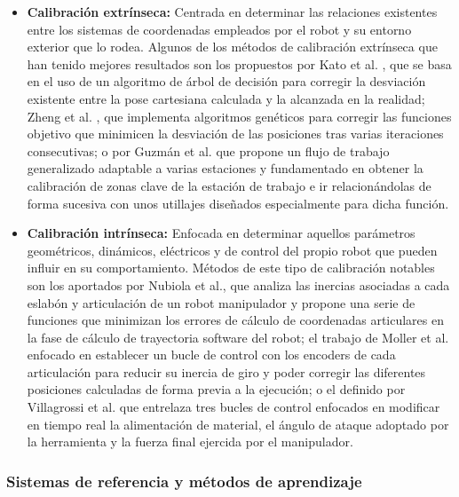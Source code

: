 \begin{itemize}
    \item \textbf{Calibración extrínseca:} Centrada en determinar las relaciones existentes entre los sistemas de coordenadas empleados por el robot y su entorno exterior que lo rodea. Algunos de los métodos de calibración extrínseca que han tenido mejores resultados son los propuestos por Kato et al. \cite{Kato_2021}, que se basa en el uso de un algoritmo de árbol de decisión para corregir la desviación existente entre la pose cartesiana calculada y la alcanzada en la realidad; Zheng et al. \cite{Zheng_2022}, que implementa algoritmos genéticos para corregir las funciones objetivo que minimicen la desviación de las posiciones tras varias iteraciones consecutivas; o por Guzmán et al.\cite{Guzman_2023} que propone un flujo de trabajo generalizado adaptable a varias estaciones y fundamentado en obtener la calibración de zonas clave de la estación de trabajo e ir relacionándolas de forma sucesiva con unos utillajes diseñados especialmente para dicha función.

    \item \textbf{Calibración intrínseca:} Enfocada en determinar aquellos parámetros geométricos, dinámicos, eléctricos y de control del propio robot que pueden influir en su comportamiento. Métodos de este tipo de calibración notables son los aportados por Nubiola et al.\cite{Nubiola2013}, que analiza las inercias asociadas a cada eslabón y articulación de un robot manipulador y propone una serie de funciones que minimizan los errores de cálculo de coordenadas articulares en la fase de cálculo de trayectoria software del robot; el trabajo de Moller et al.\cite{Moller_2017} enfocado en establecer un bucle de control con los encoders de cada articulación para reducir su inercia de giro y poder corregir las diferentes posiciones calculadas de forma previa a la ejecución; o el definido por Villagrossi et al.\cite{Villagrossi2018} que entrelaza tres bucles de control enfocados en modificar en tiempo real la alimentación de material, el ángulo de ataque adoptado por la herramienta y la fuerza final ejercida por el manipulador.
\end{itemize}

\subsubsection*{Sistemas de referencia y métodos de aprendizaje}
\hypertarget{Sistemas de referencia y métodos de aprendizaje}{}

